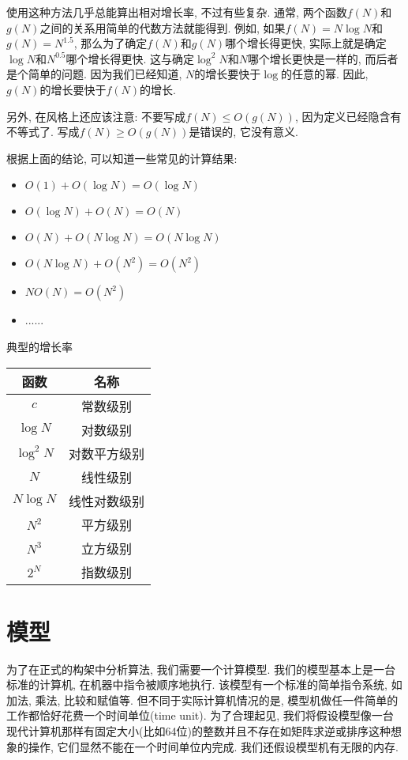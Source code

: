 \documentclass[oneside]{ctexbook}
\begin{document}
{使用这种方法几乎总能算出相对增长率, 不过有些复杂. 通常, 两个函数$f(N)$和$g(N)$之间的关系用简单的代数方法就能得到. 例如, 如果$f(N)=N\log{N}$和$g(N)=N^{1.5}$, 那么为了确定$f(N)$和$g(N)$哪个增长得更快, 实际上就是确定$\log{N}$和$N^{0.5}$哪个增长得更快. 这与确定$\log^2N$和$N$哪个增长更快是一样的, 而后者是个简单的问题. 因为我们已经知道, $N$的增长要快于$\log$的任意的幂. 因此, $g(N)$的增长要快于$f(N)$的增长.

另外, 在风格上还应该注意: 不要写成$f(N)\leq O(g(N))$, 因为定义已经隐含有不等式了. 写成$f(N)\geq O(g(N))$是错误的, 它没有意义.

根据上面的结论, 可以知道一些常见的计算结果:

\begin{itemize}
    \item $O(1) + O(\log{N}) = O(\log{N})$
    \item $O(\log{N}) + O(N) = O(N)$
    \item $O(N) + O(N\log{N}) = O(N\log{N})$
    \item $O(N\log{N}) + O(N^2) = O(N^2)$
    \item $NO(N) = O(N^2)$
    \item ......
\end{itemize}

\begin{mytable}[float=t, label=典型的增长率]{典型的增长率}
\begin{tabular}{c|c}
    函数 & 名称 \\
    \hline\hline
    $c$ & 常数级别 \\
    $\log{N}$ & 对数级别 \\
    $\log^2N$ & 对数平方级别 \\
    $N$ & 线性级别 \\
    $N\log{N}$ & 线性对数级别 \\
    $N^2$ & 平方级别 \\
    $N^3$ & 立方级别 \\
    $2^N$ & 指数级别
\end{tabular}
\end{mytable}

\section{模型}

为了在正式的构架中分析算法, 我们需要一个计算模型. 我们的模型基本上是一台标准的计算机, 在机器中指令被顺序地执行. 该模型有一个标准的简单指令系统, 如加法, 乘法, 比较和赋值等. 但不同于实际计算机情况的是, 模型机做任一件简单的工作都恰好花费一个时间单位(time unit). 为了合理起见, 我们将假设模型像一台现代计算机那样有固定大小(比如64位)的整数并且不存在如矩阵求逆或排序这种想象的操作, 它们显然不能在一个时间单位内完成. 我们还假设模型机有无限的内存.

}
\end{document}
